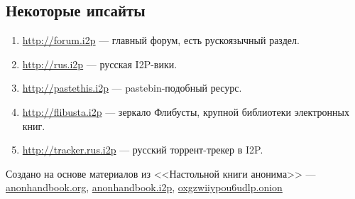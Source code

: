 \subsection*{Некоторые ипсайты}
\begin{enumerate}
\item \url{http://forum.i2p} --- главный форум, есть рускоязычный раздел.
\item \url{http://rus.i2p} --- русская I2P-вики.
\item \url{http://pastethis.i2p} --- pastebin-подобный ресурс.
\item \url{http://flibusta.i2p} --- зеркало Флибусты, крупной библиотеки электронных книг.
\item \url{http://tracker.rus.i2p} --- русский торрент-трекер в I2P.
\end{enumerate}
\vfill
\scriptsize Создано на основе материалов из <<Настольной книги анонима>> --- \url{anonhandbook.org}, \url{anonhandbook.i2p}, \url{oxgzwiiypou6udlp.onion}
\normalsize
